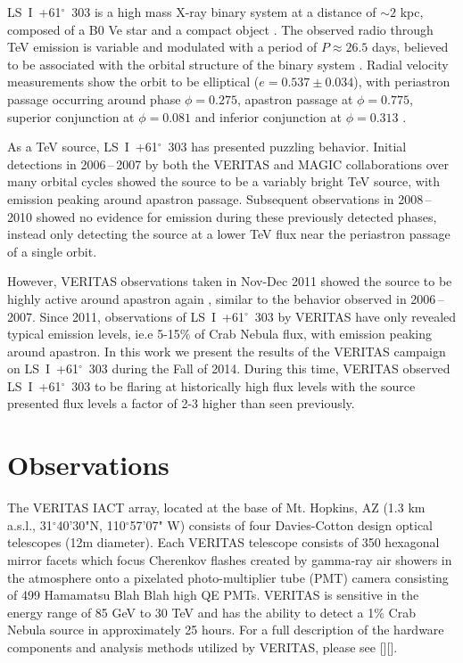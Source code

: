 \documentclass[preprint2]{aastex}
\newcommand{\lsi}{LS~I~+61$^{\circ}$~303}
\begin{document}
\lsi{} is a high mass X-ray binary system at a distance of $\sim2$ kpc, composed of a B0 Ve star and a compact object \citep{HandC1981, Casares2005}. The observed radio through TeV emission is variable and modulated with a period of $P \approx 26.5$ days, believed to be associated with the orbital structure of the binary system \citep{Abdo2009, Albert2006, VERITASLSIDetection, Esposito2007, LiXray, 2015A&A...575L...9M}. Radial velocity measurements show the orbit to be elliptical ($e = 0.537\pm0.034$), with periastron passage occurring around phase $\phi=0.275$, apastron passage at $\phi=0.775$, superior conjunction at $\phi=0.081$ and inferior conjunction at $\phi=0.313$ \citep{Aragona2009}.

As a TeV source, \lsi{} has presented puzzling behavior. Initial detections in 2006\,--\,2007 by both the VERITAS and MAGIC collaborations \citep{Albert2006, VERITASLSIDetection} over many orbital cycles showed the source to be a variably bright TeV source, with emission peaking around apastron passage. Subsequent observations in 2008\,--\,2010 \citep{2011ApJ...738....3A} showed no evidence for emission during these previously detected phases, instead only detecting the source at a lower TeV flux near the periastron passage of a single orbit. 

However, VERITAS observations taken in Nov-Dec 2011 showed the source to be highly active around apastron again \citep{2013ApJ...779...88A}, similar to the behavior observed in 2006\,--\,2007. Since 2011, observations of \lsi{} by VERITAS have only revealed typical emission levels, ie.e 5-15$\%$ of Crab Nebula flux, with emission peaking around apastron. In this work we present the results of the VERITAS campaign on \lsi{} during the Fall of 2014. During this time, VERITAS observed \lsi{} to be flaring at historically high flux levels with the source presented flux levels a factor of 2-3 higher than seen previously. 


\section{Observations}
The VERITAS IACT array, located at the base of Mt. Hopkins, AZ (1.3 km a.s.l., 31$^{\circ}$40'30"N, 110$^{\circ}$57'07" W) consists of four Davies-Cotton design optical telescopes (12m diameter). Each VERITAS telescope consists of 350 hexagonal mirror facets which focus Cherenkov flashes created by gamma-ray air showers in the atmosphere onto a pixelated photo-multiplier tube (PMT) camera consisting of 499 Hamamatsu Blah Blah high QE PMTs. VERITAS is sensitive in the energy range of 85 GeV to 30 TeV and has the ability to detect a 1$\%$ Crab Nebula source in approximately 25 hours. For a full description of the hardware components and analysis methods utilized by VERITAS, please see [][].
\end{document}
